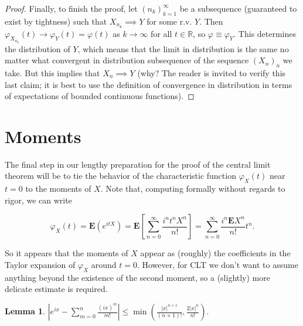 \documentclass[11pt]{report}
\newcommand{\R}{\mathbb{R}}
\theoremstyle{plain}
\newtheorem{lem}[thm]{Lemma}
\theoremstyle{definition}
\begin{document}
\begin{proof}
Finally, to finish the proof, let $(n_k)_{k=1}^\infty$
be a subsequence (guaranteed to exist by tightness)
such that $X_{n_k}\implies Y$ for some r.v. $Y$. Then
$\varphi_{X_{n_k}}(t)\to \varphi_Y(t)=\varphi(t)$ as
$k\to\infty$ for all $t\in\R$, so
$\varphi\equiv\varphi_Y$. This determines the
distribution of $Y$, which means that the limit in
distribution is the same no matter what convergent in
distribution subsequence of the sequence $(X_n)_n$ we
take. But this implies that $X_n\implies Y$ (why? The
reader is invited to verify this last claim; it is
best to use the definition of convergence in
distribution in terms of expectations of bounded
continuous functions).
\end{proof}

\section{Moments}
The final step in our lengthy preparation for the
proof of the central limit theorem will be to tie the
behavior of the characteristic function $\varphi_X(t)$
near $t=0$ to the moments of $X$. Note that,
computing formally without regards to rigor, we can
write

\[
\varphi_X(t) = \mathbf{E} (e^{itX}) = \mathbf{E}\left[\sum_{n=0}^\infty \frac{i^n t^n X^n}{n!} \right]
= \sum_{n=0}^\infty \frac{i^n \mathbf{E} X^n}{n!} t^n.
\]

So it appears that the moments of $X$ appear as
(roughly) the coefficients in the Taylor expansion of
$\varphi_X$ around $t=0$. However, for CLT we don't
want to assume anything beyond the existence of the
second moment, so a (slightly) more delicate estimate
is required.

\begin{lem}
\label{lem-taylor-estimate}
$\left|e^{ix}-\sum_{m=0}^n \frac{(ix)^m}{m!}\right|
\le
\min\left(\frac{|x|^{n+1}}{(n+1)!},\frac{2|x|^n}{n!}\right).$
\end{lem}
\end{document}
